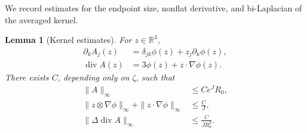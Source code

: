\documentclass{interact}
\numberwithin{equation}{section}
\theoremstyle{plain}
\newtheorem{lemma}[theorem]{Lemma}
\theoremstyle{definition}
\theoremstyle{remark}
\newcommand{\R}{\mathbb R}
\begin{document}
We record estimates for the endpoint size, nonflat derivative, and bi-Laplacian of the averaged kernel.

\begin{lemma}[Kernel estimates]\label{lem:kernel-bounds}
For $z\in\R^3$,
\begin{align}
 \partial_kA_j(z)
 &=\delta_{jk}\phi(z)+z_j\partial_k\phi(z),
 \label{eq:A-Hessian}\\
 \operatorname{div}A(z)
 &=3\phi(z)+z\cdot\nabla\phi(z).
 \label{eq:A-divergence}
\end{align}
There exists $C$, depending only on $\zeta$, such that
\begin{align}
 \|A\|_\infty&\le Ce^JR_0,
 \label{eq:A-endpoint-bound}\\
 \|z\otimes\nabla\phi\|_\infty
 +\|z\cdot\nabla\phi\|_\infty
 &\le \frac{C}{J},
 \label{eq:flat-error-bound}\\
 \|\Delta\operatorname{div}A\|_\infty
 &\le \frac{C}{JR_0^2}.
 \label{eq:biharmonic-bound}
\end{align}
\end{lemma}
\end{document}
